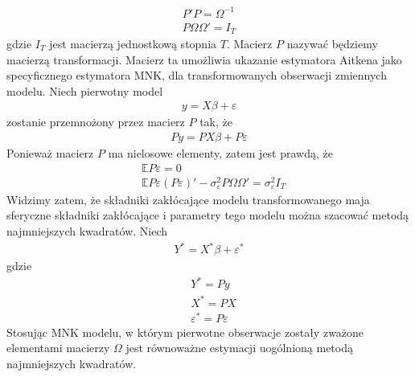 \begin{gather*}
P'P=\Omega^{-1}\\
P\Omega\Omega'=I_T
\end{gather*}
gdzie $ I_T $ jest macierzą jednostkową stopnia $ T $.
Macierz $ P $ nazywać będziemy macierzą transformacji. Macierz ta umożliwia ukazanie estymatora Aitkena jako specyficznego estymatora MNK, dla transformowanych obserwacji zmiennych modelu. Niech pierwotny model
\begin{gather*}
y=X\beta+\varepsilon
\end{gather*}
zostanie przemnożony przez macierz $ P $ tak, że
\begin{gather*}
Py=PX\beta+P\varepsilon
\end{gather*}
Ponieważ macierz $ P $ ma nielosowe elementy, zatem jest prawdą, że
\begin{align*}
&\mathbb E P\varepsilon=0\\
&\mathbb E P\varepsilon\left(P\varepsilon\right)'-\sigma_\varepsilon^2 P\Omega\Omega'=\sigma_\varepsilon^2 I_T
\end{align*}
Widzimy zatem, że składniki zakłócające modelu transformowanego maja sferyczne składniki zakłócające i parametry tego modelu można szacować metodą najmniejszych kwadratów. Niech
\begin{gather*}
Y^*=X^*\beta+\varepsilon^*
\end{gather*}
gdzie
\begin{align*}
&Y^*=Py\\
&X^*=PX\\
&\varepsilon^*=P\varepsilon
\end{align*}
Stosując MNK modelu, w którym pierwotne obserwacje zostały zważone elementami macierzy $ \Omega $ jest równoważne estymacji uogólnioną metodą najmniejszych kwadratów.
